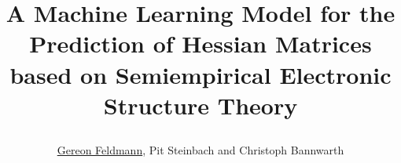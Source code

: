 
\title{
	\parbox[t]{0.9\linewidth}{
		\bigskip\bigskip
		\centering
		A Machine Learning Model for the Prediction of Hessian Matrices based on Semiempirical Electronic Structure Theory
		\vspace{-5mm}
}
}
\author{\underline{Gereon Feldmann}, Pit Steinbach and Christoph Bannwarth}

\makeatletter
\renewcommand\TP@maketitle{%
	\centering
		\color{titlefgcolor}
		{\bfseries \Huge \@title \par}
		\vspace*{1em}
		{\huge \@author \par}
		\vspace*{1em}
		{\LARGE \@institute}
	\tikz[remember picture,overlay]\node[scale=1,anchor=east,xshift=0.615\linewidth,yshift=3cm,inner sep=0pt] {\@titlegraphic};
}
\makeatother